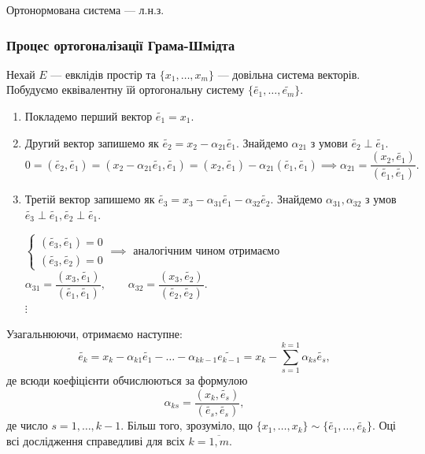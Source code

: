 \documentclass{math_library}
\begin{document}
\begin{corollary}
Ортонормована система --- л.н.з.
\end{corollary}

\subsubsection*{Процес ортогоналізації Грама-Шмідта}
Нехай $E$ --- евклідів простір та $\{x_1,\dots,x_m\}$ --- довільна система векторів. Побудуємо еквівалентну їй ортогональну систему $\{\widetilde{e_1},\dots, \widetilde{e_m} \}$.
\begin{enumerate}[wide=0pt,label={\arabic*)}]
\item Покладемо перший вектор $\widetilde{e_1}=x_1$.
\item Другий вектор запишемо як $\widetilde{e_2} = x_2 - \alpha_{21} \widetilde{e_1}$. Знайдемо $\alpha_{21}$ з умови $\widetilde{e_2} \perp \widetilde{e_1}$.
\[
0 = (\widetilde{e_2}, \widetilde{e_1}) = (x_2-\alpha_{21}\widetilde{e_1}, \widetilde{e_1}) = (x_2, \widetilde{e_1})-\alpha_{21} (\widetilde{e_1},\widetilde{e_1}) \implies \alpha_{21} = \dfrac{(x_2,\widetilde{e_1})}{(\widetilde{e_1},\widetilde{e_1})}.
\]
\item Третій вектор запишемо як $\widetilde{e_3} = x_3 - \alpha_{31} \widetilde{e_1} - \alpha_{32} \widetilde{e_2}$. Знайдемо $\alpha_{31}, \alpha_{32}$ з умов $\widetilde{e_3} \perp \widetilde{e_1}, \widetilde{e_2} \perp \widetilde{e_1}$.
\begin{center}
$\begin{cases}
(\widetilde{e_3}, \widetilde{e_1}) = 0 \\
(\widetilde{e_3}, \widetilde{e_2}) = 0
\end{cases}
\implies$
аналогічним чином отримаємо $\alpha_{31} = \dfrac{(x_3, \widetilde{e_1})}{(\widetilde{e_1},\widetilde{e_1})}, \qquad \alpha_{32} = \dfrac{(x_3, \widetilde{e_2})}{(\widetilde{e_2},\widetilde{e_2})}$.\\
$\vdots$
\end{center}
\end{enumerate}
Узагальнюючи, отримаємо наступне:
\[
\widetilde{e_k} = x_k - \alpha_{k1} \widetilde{e_1} - \dots - \alpha_{k k-1} \widetilde{e_{k-1}} = x_k - \displaystyle\sum_{s=1}^{k=1} \alpha_{ks} \widetilde{e_s},
\]
де всюди коефіцієнти обчислюються за формулою
\[
\alpha_{ks} = \dfrac{(x_k, \widetilde{e_s})}{(\widetilde{e_s},\widetilde{e_s})},
\] де число $s = 1,\dots,k-1$. Більш того, зрозуміло, що $\{x_1,\dots,x_k\} \sim \{\widetilde{e_1},\dots, \widetilde{e_k}\}$. Оці всі дослідження справедливі для всіх $k = \overline{1,m}$.
\end{document}
